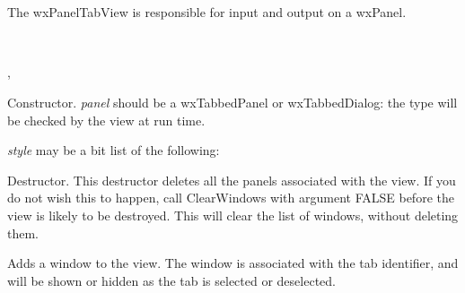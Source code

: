 \section{}\label{wxpaneltabview}

The wxPanelTabView is responsible for input and output on a wxPanel.


\\


, 


\label{wxpaneltabviewconstr}


Constructor. {\it panel} should be a wxTabbedPanel or wxTabbedDialog: the type will be checked by the view at run time.

{\it style} may be a bit list of the following:

\begin{twocollist}\itemsep=0pt
\end{twocollist}



Destructor. This destructor deletes all the panels associated with the view.
If you do not wish this to happen, call ClearWindows with argument FALSE before the
view is likely to be destroyed. This will clear the list of windows, without deleting them.

\label{wxpaneltabviewaddtabwindow}


Adds a window to the view. The window is associated with the tab identifier, and will be shown or hidden as the tab
is selected or deselected.


